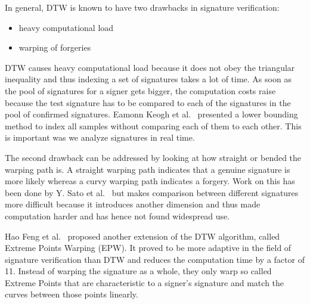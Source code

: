 \documentclass[a4paper, oneside]{csthesis}
\begin{document}
In general, DTW is known to have two drawbacks in signature verification:
\begin{itemize}
\item heavy computational load
\item warping of forgeries
\end{itemize}

DTW causes heavy computational load because it does not obey the triangular inequality and thus indexing a set of signatures takes a lot of time. As soon as the pool of signatures for a signer gets bigger, the computation costs raise because the test signature has to be compared to each of the signatures in the pool of confirmed signatures. Eamonn Keogh et al.~\cite{Keogh:2002:EID:1287369.1287405} presented a lower bounding method to index all samples without comparing each of them to each other. This is important was we analyze signatures in real time.

The second drawback can be addressed by looking at how straight or bended the warping path is. A straight warping path indicates that a genuine signature is more likely whereas a curvy warping path indicates a forgery. Work on this has been done by Y. Sato et al.~\cite{Sato1982} but makes comparison between different signatures more difficult because it introduces another dimension and thus made computation harder and has hence not found widespread use.

Hao Feng et al.~\cite{Feng:2003:OSV:961320.961331} proposed another extension of the DTW algorithm, called Extreme Points Warping (EPW). It proved to be more adaptive in the field of signature verification than DTW and reduces the computation time by a factor of 11.  Instead of warping the signature as a whole, they only warp so called Extreme Points that are characteristic to a signer's signature and match the curves between those points linearly.




\end{document}
